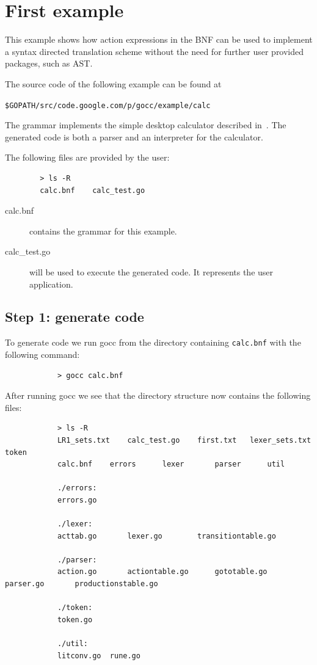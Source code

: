 \documentclass[12pt]{article}
\begin{document}
\section{First example}\label{sec:first example}
	This example shows how action expressions in the BNF can be used to implement a syntax directed translation scheme without the need for further user provided packages, such as AST.

	The source code of the following example can be found at 

	\verb|$GOPATH/src/code.google.com/p/gocc/example/calc| 

	The grammar implements the simple desktop calculator described in~\cite{Dragon Book}. The generated code is both a parser and an interpreter for the calculator.

	The following files are provided by the user:
	\begin{verbatim}
		> ls -R
		calc.bnf	calc_test.go	
	\end{verbatim}

	\begin{description}
		\item[calc.bnf] contains the grammar for this example.

		\item[calc\_test.go] will be used to execute the generated code. It represents the user application.

	\end{description}

	\subsection{Step 1: generate code}
		To generate code we run gocc from the directory containing \verb|calc.bnf| with the following command:

		\begin{verbatim}
			> gocc calc.bnf
		\end{verbatim}

		After running gocc we see that the directory structure now contains the following files:

		\begin{verbatim}
			> ls -R
			LR1_sets.txt	calc_test.go	first.txt	lexer_sets.txt	token
			calc.bnf	errors		lexer		parser		util

			./errors:
			errors.go

			./lexer:
			acttab.go		lexer.go		transitiontable.go

			./parser:
			action.go		actiontable.go		gototable.go		parser.go		productionstable.go

			./token:
			token.go

			./util:
			litconv.go	rune.go
		\end{verbatim}
\end{document}
